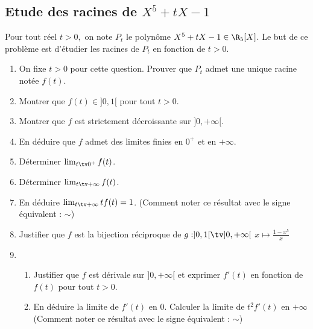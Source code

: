 

\subsection{Etude des racines de  $X^5 +tX-1$}

\begin{exercice}
Pour tout réel $t>0, $ on note $P_t$ le polynôme $X^5 +tX-1 \in \R_5[X]$. Le but de ce problème est d'étudier les racines de $P_t$ en fonction de $t>0$. 
\begin{enumerate}
\item On fixe $t>0$ pour cette question. Prouver que $P_t$ admet une unique racine notée $f(t)$. 
\item Montrer que $f(t) \in ]0,1[$ pour tout $t>0.$
\item Montrer que $f$ est strictement décroissante sur $]0,+\infty[$.
\item En déduire que $f$ admet des limites finies en $0^+$ et en $+\infty$.

\item Déterminer $\lim_{t\tv 0^+} f(t)$. 

\item Déterminer $\lim_{t\tv+\infty} f(t)$. 
\item En déduire  $\lim_{t\tv +\infty} tf(t)= 1$. (Comment noter ce résultat avec le signe équivalent : $\sim$) 

\item Justifier que $f$ est la bijection réciproque de $g : ]0,1[\tv ]0,+\infty[$ 
$x \mapsto\frac{1-x^5}{x}$
\item \begin{enumerate}
\item Justifier que $f$ est dérivale sur $]0,+\infty[ $ et exprimer $f'(t)$ en fonction de $f(t)$ pour tout $t>0$.
\item En déduire la limite de $f'(t)$ en $0$. Calculer la limite de $t^2 f'(t)$ en $+\infty$ (Comment noter ce résultat avec le signe équivalent : $\sim$) 
\end{enumerate}
\end{enumerate}
\end{exercice}

